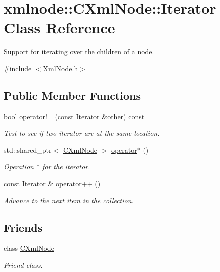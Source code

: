 \hypertarget{classxmlnode_1_1_c_xml_node_1_1_iterator}{}\section{xmlnode\+:\+:C\+Xml\+Node\+:\+:Iterator Class Reference}
\label{classxmlnode_1_1_c_xml_node_1_1_iterator}


Support for iterating over the children of a node.  




{\ttfamily \#include $<$Xml\+Node.\+h$>$}

\subsection*{Public Member Functions}
\begin{DoxyCompactItemize}
\item 
bool \mbox{\hyperlink{classxmlnode_1_1_c_xml_node_1_1_iterator_a55c86e64262a6ef16e253f2aef70578c}{operator!=}} (const \mbox{\hyperlink{classxmlnode_1_1_c_xml_node_1_1_iterator}{Iterator}} \&other) const
\begin{DoxyCompactList}\small\item\em Test to see if two iterator are at the same location. \end{DoxyCompactList}\item 
std\+::shared\+\_\+ptr$<$ \mbox{\hyperlink{classxmlnode_1_1_c_xml_node}{C\+Xml\+Node}} $>$ \mbox{\hyperlink{classxmlnode_1_1_c_xml_node_1_1_iterator_a6d255a513c60c7de55a01c5eb626bf6d}{operator$\ast$}} ()
\begin{DoxyCompactList}\small\item\em Operation $\ast$ for the iterator. \end{DoxyCompactList}\item 
const \mbox{\hyperlink{classxmlnode_1_1_c_xml_node_1_1_iterator}{Iterator}} \& \mbox{\hyperlink{classxmlnode_1_1_c_xml_node_1_1_iterator_aefa7392f7c198dcf907d8458fbf0db1a}{operator++}} ()
\begin{DoxyCompactList}\small\item\em Advance to the next item in the collection. \end{DoxyCompactList}\end{DoxyCompactItemize}
\subsection*{Friends}
\begin{DoxyCompactItemize}
\item 
\mbox{\label{classxmlnode_1_1_c_xml_node_1_1_iterator_a770307dc9d4e2e7005bcf200bae3066a}} 
class \mbox{\hyperlink{classxmlnode_1_1_c_xml_node_1_1_iterator_a770307dc9d4e2e7005bcf200bae3066a}{C\+Xml\+Node}}
\begin{DoxyCompactList}\small\item\em Friend class. \end{DoxyCompactList}\end{DoxyCompactItemize}


